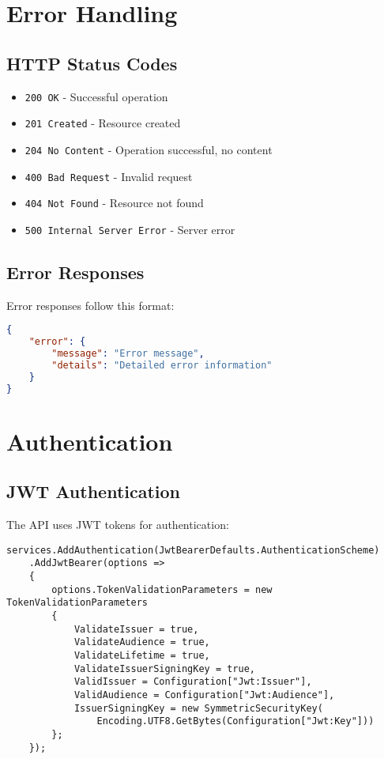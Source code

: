 \section{Error Handling}

\subsection{HTTP Status Codes}
\begin{itemize}
    \item \texttt{200 OK} - Successful operation
    \item \texttt{201 Created} - Resource created
    \item \texttt{204 No Content} - Operation successful, no content
    \item \texttt{400 Bad Request} - Invalid request
    \item \texttt{404 Not Found} - Resource not found
    \item \texttt{500 Internal Server Error} - Server error
\end{itemize}

\subsection{Error Responses}
Error responses follow this format:

\begin{lstlisting}[language=json]
{
    "error": {
        "message": "Error message",
        "details": "Detailed error information"
    }
}
\end{lstlisting}

\section{Authentication}

\subsection{JWT Authentication}
The API uses JWT tokens for authentication:

\begin{lstlisting}[language=CSharp]
services.AddAuthentication(JwtBearerDefaults.AuthenticationScheme)
    .AddJwtBearer(options =>
    {
        options.TokenValidationParameters = new TokenValidationParameters
        {
            ValidateIssuer = true,
            ValidateAudience = true,
            ValidateLifetime = true,
            ValidateIssuerSigningKey = true,
            ValidIssuer = Configuration["Jwt:Issuer"],
            ValidAudience = Configuration["Jwt:Audience"],
            IssuerSigningKey = new SymmetricSecurityKey(
                Encoding.UTF8.GetBytes(Configuration["Jwt:Key"]))
        };
    });
\end{lstlisting}

